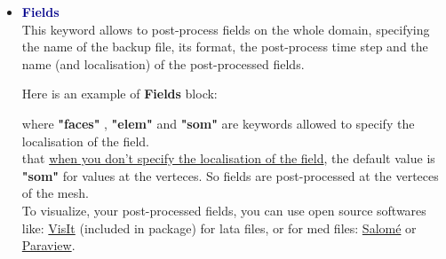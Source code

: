 \begin{itemize}





\item \textcolor{darkblue}{\textbf{Fields}}\\
This keyword allows to post-process fields on the whole domain, specifying the name of the backup file, its format, the post-process time step and the name (and localisation) of the post-processed fields.

Here is an example of \textbf{Fields} block:
    \begin{center}
    \end{center}

where \textbf{"faces"} , \textbf{"elem"} and \textbf{"som"} are keywords allowed to specify the localisation of the field.\\

\Note that \underline{when you don't specify the localisation of the field}, the default value is \textbf{"som"} for values at the verteces. So fields are post-processed at the verteces of the mesh.\\

To visualize, your post-processed fields, you can use open source softwares like: \href{https://wci.llnl.gov/simulation/computer-codes/visit}{VisIt} (included in \trust package) for lata files, or for med files: \href{http://www.salome-platform.org}{Salom\'e} or \href{http://www.paraview.org}{Paraview}.\\


\end{itemize}
